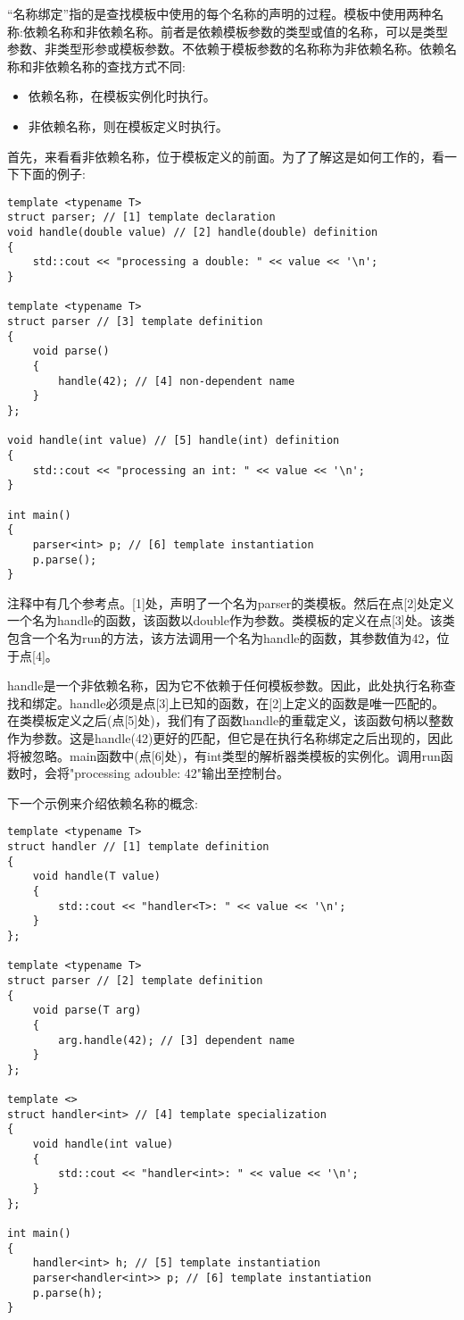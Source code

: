 
“名称绑定”指的是查找模板中使用的每个名称的声明的过程。模板中使用两种名称:依赖名称和非依赖名称。前者是依赖模板参数的类型或值的名称，可以是类型参数、非类型形参或模板参数。不依赖于模板参数的名称称为非依赖名称。依赖名称和非依赖名称的查找方式不同:

\begin{itemize}
\item
依赖名称，在模板实例化时执行。

\item
非依赖名称，则在模板定义时执行。
\end{itemize}

首先，来看看非依赖名称，位于模板定义的前面。为了了解这是如何工作的，看一下下面的例子:

\begin{lstlisting}[style=styleCXX]
template <typename T>
struct parser; // [1] template declaration
void handle(double value) // [2] handle(double) definition
{
	std::cout << "processing a double: " << value << '\n';
}

template <typename T>
struct parser // [3] template definition
{
	void parse()
	{
		handle(42); // [4] non-dependent name
	}
};

void handle(int value) // [5] handle(int) definition
{
	std::cout << "processing an int: " << value << '\n';
}

int main()
{
	parser<int> p; // [6] template instantiation
	p.parse();
}
\end{lstlisting}

注释中有几个参考点。[1]处，声明了一个名为parser的类模板。然后在点[2]处定义一个名为handle的函数，该函数以double作为参数。类模板的定义在点[3]处。该类包含一个名为run的方法，该方法调用一个名为handle的函数，其参数值为42，位于点[4]。

handle是一个非依赖名称，因为它不依赖于任何模板参数。因此，此处执行名称查找和绑定。handle必须是点[3]上已知的函数，在[2]上定义的函数是唯一匹配的。在类模板定义之后(点[5]处)，我们有了函数handle的重载定义，该函数句柄以整数作为参数。这是handle(42)更好的匹配，但它是在执行名称绑定之后出现的，因此将被忽略。main函数中(点[6]处)，有int类型的解析器类模板的实例化。调用run函数时，会将"processing adouble: 42"输出至控制台。

下一个示例来介绍依赖名称的概念:

\begin{lstlisting}[style=styleCXX]
template <typename T>
struct handler // [1] template definition
{
	void handle(T value)
	{
		std::cout << "handler<T>: " << value << '\n';
	}
};

template <typename T>
struct parser // [2] template definition
{
	void parse(T arg)
	{
		arg.handle(42); // [3] dependent name
	}
};

template <>
struct handler<int> // [4] template specialization
{
	void handle(int value)
	{
		std::cout << "handler<int>: " << value << '\n';
	}
};

int main()
{
	handler<int> h; // [5] template instantiation
	parser<handler<int>> p; // [6] template instantiation
	p.parse(h);
}
\end{lstlisting}

